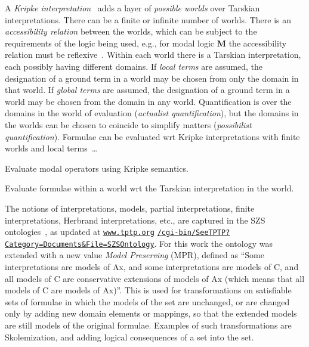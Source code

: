 \documentclass{easychair}
\newenvironment{packed_itemize}{
\vspace*{-0.3em}
\begin{itemize}
\setlength{\partopsep}{0pt}
\setlength{\itemsep}{1pt}
\setlength{\parskip}{0pt}
\setlength{\parsep}{0pt}
}{\end{itemize}}
\begin{document}
A \emph{Kripke interpretation}~\cite{Kri63} adds a layer of \emph{possible worlds} over Tarskian 
interpretations.
There can be a finite or infinite number of worlds.
There is an \emph{accessibility relation} between the worlds, which can be subject to the
requirements of the logic being used, e.g., for modal logic \textbf{M} the accessibility 
relation must be reflexive~\cite{Gar18}.
Within each world there is a Tarskian interpretation, each possibly having different domains.
If \emph{local terms} are assumed, the designation of a ground term in a world may be chosen 
from only the domain in that world. 
If \emph{global terms} are assumed, the designation of a ground term in a world may be chosen 
from the domain in any world.
Quantification is over the domains in the world of evaluation (\emph{actualist quantification}), 
but the domains in the worlds can be chosen to coincide to simplify matters (\emph{possibilist 
quantification}).
Formulae can be evaluated wrt Kripke interpretations with finite worlds and local terms~\ldots
\begin{packed_itemize}
\item Evaluate modal operators using Kripke semantics.
\item Evaluate formulae within a world wrt the Tarskian interpretation in the world.
\end{packed_itemize}

The notions of interpretations, models, partial interpretations, finite interpretations,
Herbrand interpretations, etc., are captured in the SZS ontologies~\cite{Sut08-KEAPPA}, as
updated at 
\href{https://www.tptp.org/cgi-bin/SeeTPTP?Category=Documents\&File=SZSOntology}{\tt www.tptp.org}
\href{https://www.tptp.org/cgi-bin/SeeTPTP?Category=Documents\&File=SZSOntology}{\tt /cgi-bin/SeeTPTP?Category=Documents\&File=SZSOntology}.
For this work the ontology was extended with a new value \emph{Model Preserving} (MPR), defined
as ``Some interpretations are models of Ax, and
  some interpretations are models  of C, and
  all models of C are conservative extensions of models of Ax
  (which means that all models of C are models of Ax)''.
This is used for transformations on satisfiable sets of formulae in which the models of the set 
are unchanged, or are changed only by adding new domain elements or mappings, so that the
extended models are still models of the original formulae. 
Examples of such transformations are Skolemization, and adding logical consequences of a set 
into the set.

\end{document}
